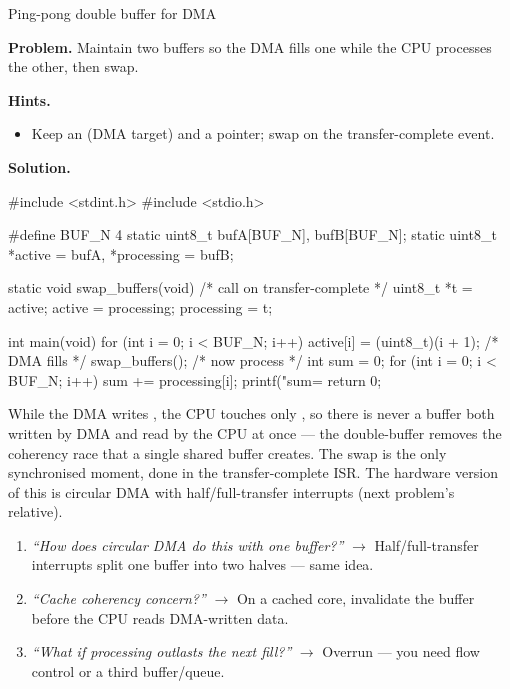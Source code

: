 \begin{gymproblem}{Ping-pong double buffer for DMA}

\textbf{Problem.} Maintain two buffers so the DMA fills one while the CPU
processes the other, then swap.

\textbf{Hints.}
\begin{itemize}
\item Keep an  (DMA target) and a  pointer; swap
  on the transfer-complete event.
\end{itemize}

\attempt

\textbf{Solution.}
\begin{cgym}
#include <stdint.h>
#include <stdio.h>

#define BUF_N 4
static uint8_t  bufA[BUF_N], bufB[BUF_N];
static uint8_t *active = bufA, *processing = bufB;

static void swap_buffers(void) {              /* call on transfer-complete */
    uint8_t *t = active; active = processing; processing = t;
}

int main(void) {
    for (int i = 0; i < BUF_N; i++) active[i] = (uint8_t)(i + 1);  /* DMA fills */
    swap_buffers();                                                /* now process */
    int sum = 0;
    for (int i = 0; i < BUF_N; i++) sum += processing[i];
    printf("sum=%
    return 0;
}
\end{cgym}

While the DMA writes , the CPU touches only , so
there is never a buffer both written by DMA and read by the CPU at once --- the
double-buffer removes the coherency race that a single shared buffer creates.
The swap is the only synchronised moment, done in the transfer-complete ISR. The
hardware version of this is circular DMA with half/full-transfer interrupts
(next problem's relative).

\followups
\begin{enumerate}
\item \emph{``How does circular DMA do this with one buffer?''} $\rightarrow$
  Half/full-transfer interrupts split one buffer into two halves --- same idea.
\item \emph{``Cache coherency concern?''} $\rightarrow$ On a cached core,
  invalidate the buffer before the CPU reads DMA-written data.
\item \emph{``What if processing outlasts the next fill?''} $\rightarrow$
  Overrun --- you need flow control or a third buffer/queue.
\end{enumerate}
\end{gymproblem}

